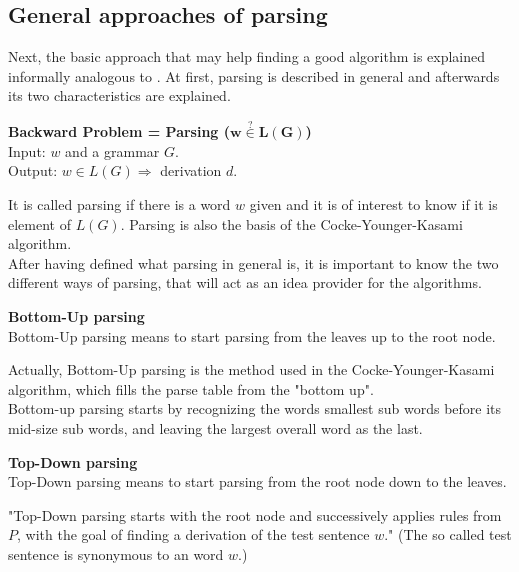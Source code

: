 \subsection{General approaches of parsing} \label{approaches}
Next, the basic approach that may help finding a good algorithm is explained informally analogous to \cite{Duda.2012}. At first, parsing is described in general and afterwards its two characteristics are explained.  
\begin{DefGrey}
	\textbf{Backward Problem = Parsing ($\mathbf{w\overset{?}{\in}L(G)}$)}\\
	Input: $w$ and a grammar $G$. \\
	Output: $w \in L(G) \Longrightarrow$ derivation $d$.
\end{DefGrey}
\noindent It is called parsing if there is a word $w$ given and it is of interest to know if it is element of $L(G)$. Parsing is also the basis of the Cocke-Younger-Kasami algorithm.\\
After having defined what parsing in general is, it is important to know the two different ways of parsing, that will act as an idea provider for the algorithms.
\begin{mdframed}[backgroundcolor=defColour]
	\textbf{Bottom-Up parsing} \\
Bottom-Up parsing means to start parsing from the leaves up to the root node.
\end{mdframed}
\noindent Actually, Bottom-Up parsing is the method used in the Cocke-Younger-Kasami algorithm, which fills the parse table from the "bottom up"\cite{Duda.2012}.\\
Bottom-up parsing starts by recognizing the words smallest sub words before its mid-size sub words, and leaving the largest overall word as the last.
\begin{mdframed}[backgroundcolor=defColour]
	\textbf{Top-Down parsing} \\
	 Top-Down parsing means to start parsing from the root node down to the leaves.
\end{mdframed}
\noindent "Top-Down parsing starts with the root node and successively applies rules from $P$, with the goal of finding a derivation of the test sentence $w$." \cite{Duda.2012} (The so called test sentence is synonymous to an word $w$.)
\pagebreak
